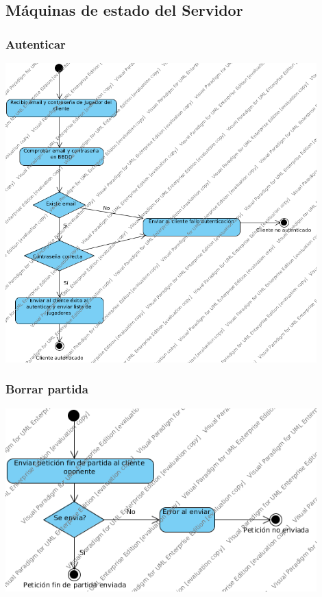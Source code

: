 \documentclass[a4paper,11pt,oneside]{article}
\begin{document}
\subsection{Máquinas de estado del Servidor}

\subsubsection{Autenticar}

\includegraphics[width=0.9\textwidth]{img/ms_AutenticarServidor.png}\\[1cm]

\subsubsection{Borrar partida}

\includegraphics[width=0.9\textwidth]{img/ms_BorrarPartidaServidor.png}\\[1cm]
\end{document}
